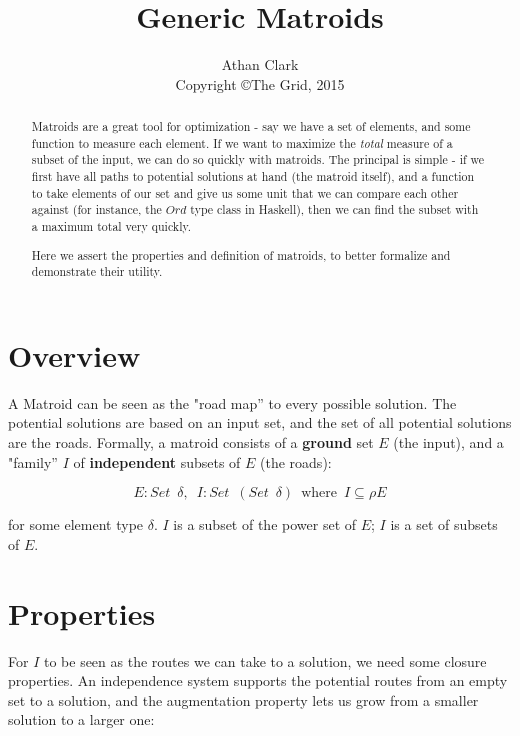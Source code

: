 \documentclass{article}
\begin{document}
\title{Generic Matroids}
\author{Athan Clark\\ Copyright \copyright \enspace The Grid, 2015}

\maketitle

\begin{abstract}
  Matroids are a great tool for optimization - say we have a set of elements, and
  some function to measure each element. If we want to maximize the \textit{total}
  measure of a subset of the input, we can do so quickly with matroids. The principal
  is simple - if we first have all paths to potential solutions at hand (the matroid itself),
  and a function to take elements of our set and give us some unit that we can compare
  each other against (for instance, the \(Ord\) type class in Haskell), then we can
  find the subset with a maximum total very quickly.

  Here we assert the properties and definition of matroids, to better formalize and
  demonstrate their utility.
\end{abstract}

\section{Overview}

A Matroid can be seen as the "road map'' to every possible solution.
The potential solutions are based on an input set, and the
set of all potential solutions are the roads. Formally, a matroid consists of
a \textbf{ground} set \(E\) (the input), and a "family'' \(I\) of \textbf{independent}
subsets of \(E\) (the roads):

\[
             E : Set \enspace \delta
  , \enspace I : Set \enspace (Set \enspace \delta)
  \enspace \mathrm{where} \enspace I \subseteq \rho E
\]

for some element type \(\delta\).
\(I\) is a subset of the power set of \(E\); \(I\) is a set of subsets of \(E\).

\section{Properties}

For \(I\) to be seen as the routes we can take to a solution, we need some closure
properties. An independence system supports the potential routes from an empty set
to a solution, and the augmentation property lets us grow from a smaller solution
to a larger one:
\end{document}
